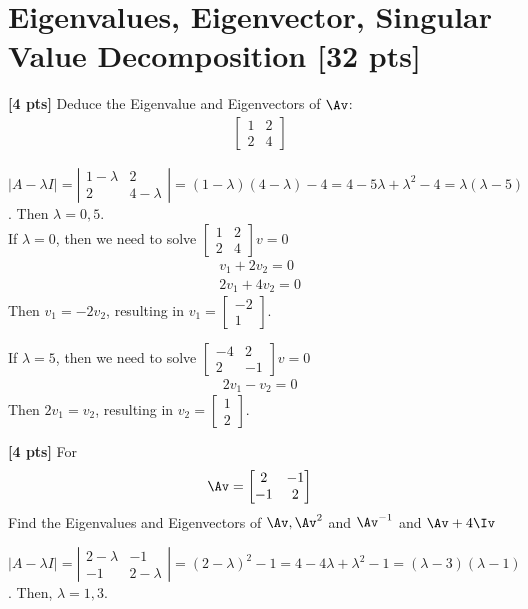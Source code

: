 \documentclass[11pt,addpoints,answers]{exam}
\numberwithin{equation}{section} %
\numberwithin{figure}{section} %
\numberwithin{table}{section} %
\newcommand{\twodet}[4]{\left|\begin{matrix} #1 & #2 \\ #3 & #4 \end{matrix}\right|}
\newcommand{\twomat}[4]{\begin{bmatrix} #1 & #2 \\ #3 & #4 \end{bmatrix}}
\newcommand{\twovec}[2]{\begin{bmatrix} #1 \\ #2 \end{bmatrix}}
\begin{document}
\section{Eigenvalues, Eigenvector, Singular Value Decomposition [32 pts]}
\begin{questions}

    \question \textbf{[4 pts]}  Deduce the Eigenvalue and Eigenvectors of $\Av$:
    \begin{align*}
        \begin{bmatrix}
            1 & 2 \\ 2 & 4
        \end{bmatrix}
    \end{align*}
    \begin{tcolorbox}[fit, height=7cm, width=\textwidth, blank, borderline={0.5pt}{-2pt}, nobeforeafter]
        $\left|A - \lambda I \right| = \twodet{1 - \lambda}{2}{2}{4 - \lambda} = (1 - \lambda)(4 - \lambda) - 4 = 4 - 5\lambda + \lambda^2 - 4 = \lambda (\lambda - 5)$. Then $\lambda = 0, 5$.\\
        
        If $\lambda = 0$, then we need to solve $\twomat{1}{2}{2}{4} v = 0$
        $$
            \begin{array}{c}
                v_1 + 2v_2 = 0  \\ 2v_1 + 4v_2 = 0
            \end{array}
        $$
        Then $v_1 = -2v_2$, resulting in $v_1 = \twovec{-2}{1}$.

        If $\lambda = 5$, then we need to solve $\twomat{-4}{2}{2}{-1} v = 0$
        $$
            \begin{array}{c}
                2v_1 - v_2 = 0
            \end{array}
        $$
        Then $2v_1 = v_2$, resulting in $v_2 = \twovec{1}{2}$.
    \end{tcolorbox}

    \question \textbf{[4 pts]}   For
    \begin{align*}
         \Av = \begin{bmatrix}
             2 & -1 \\ -1 & 2
         \end{bmatrix}
     \end{align*}
     Find the Eigenvalues and Eigenvectors of $\Av, \Av^2$ and $\Av^{-1}$ and $\Av + 4\Iv$

    \begin{tcolorbox}[fit, height=6cm, width=\textwidth, blank, borderline={0.5pt}{-2pt}, nobeforeafter]
        $\left|A - \lambda I \right| = \twodet{2 - \lambda}{-1}{-1}{2 - \lambda} = (2 - \lambda)^2 - 1 = 4 - 4\lambda + \lambda^2 - 1 = (\lambda - 3)(\lambda - 1)$. Then, $\lambda = 1, 3$.\\
        

\end{tcolorbox}
\end{questions}
\end{document}
